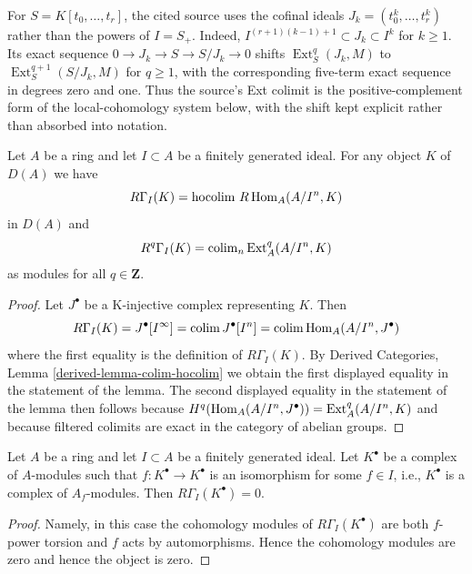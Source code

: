 \begin{lemma}
\label{lemma-local-cohomology-ext}
\begin{reference}
\cite[Chapter III, \S 4, no. 69, Corollary 2 and transition map,
p. 263]{FAC}
\end{reference}
\begin{history}
For $S=K[t_0,\ldots,t_r]$, the cited source uses the cofinal ideals
$J_k=(t_0^k,\ldots,t_r^k)$ rather than the powers of
$I=S_+$. Indeed,
$I^{(r+1)(k-1)+1}\subset J_k\subset I^k$ for $k\geq1$. Its exact sequence
$0\to J_k\to S\to S/J_k\to0$ shifts
$\operatorname{Ext}^q_S(J_k,M)$ to
$\operatorname{Ext}^{q+1}_S(S/J_k,M)$ for $q\geq1$, with the corresponding
five-term exact sequence in degrees zero and one. Thus the source's Ext
colimit is the positive-complement form of the local-cohomology system below,
with the shift kept explicit rather than absorbed into notation.
\end{history}
Let $A$ be a ring and let $I \subset A$ be a finitely generated ideal.
For any object $K$ of $D(A)$ we have
$$
R\Gamma_I(K) = \text{hocolim}\ R\Hom_A(A/I^n, K)
$$
in $D(A)$ and
$$
R^q\Gamma_I(K) = \mathop{\mathrm{colim}}\nolimits_n \mathop{\mathrm{Ext}}\nolimits_A^q(A/I^n, K)
$$
as modules for all $q \in \mathbf{Z}$.
\end{lemma}

\begin{proof}
Let $J^\bullet$ be a K-injective complex representing $K$. Then
$$
R\Gamma_I(K) = J^\bullet[I^\infty] = \mathop{\mathrm{colim}}\nolimits J^\bullet[I^n] =
\mathop{\mathrm{colim}}\nolimits \mathop{\mathrm{Hom}}\nolimits_A(A/I^n, J^\bullet)
$$
where the first equality is the definition of $R\Gamma_I(K)$.
By Derived Categories, Lemma \ref{derived-lemma-colim-hocolim}
we obtain the first displayed equality in the statement of the lemma.
The second displayed equality in the statement of the lemma then
follows because $H^q(\mathop{\mathrm{Hom}}\nolimits_A(A/I^n, J^\bullet)) = \mathop{\mathrm{Ext}}\nolimits^q_A(A/I^n, K)$
and because filtered colimits are exact in the category of abelian
groups.
\end{proof}

\begin{lemma}
\label{lemma-bad-local-cohomology-vanishes}
Let $A$ be a ring and let $I \subset A$ be a finitely generated ideal.
Let $K^\bullet$ be a complex of $A$-modules such that
$f : K^\bullet \to K^\bullet$ is an isomorphism for some
$f \in I$, i.e., $K^\bullet$ is a complex of $A_f$-modules. Then
$R\Gamma_I(K^\bullet) = 0$.
\end{lemma}

\begin{proof}
Namely, in this case the cohomology modules of $R\Gamma_I(K^\bullet)$
are both $f$-power torsion and $f$ acts by automorphisms. Hence the
cohomology modules are zero and hence the object is zero.
\end{proof}

